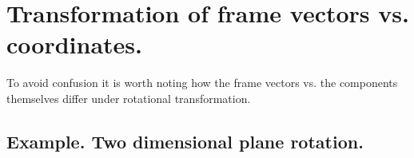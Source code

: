 
\section{Transformation of frame vectors vs. coordinates. }

To avoid confusion it is worth noting how the frame vectors vs. the components themselves differ under
rotational transformation.

\subsection{Example.  Two dimensional plane rotation. }

